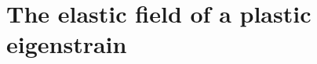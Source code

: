 \documentclass[10pt]{report}
\begin{document}

\tableofcontents



\newtheorem{mytheorem}{Theorem}
\newtheorem{mydefinition}{Definition}






\newcommand{\dL}[0]{\, \text{d}L}
\newcommand{\dA}[0]{\, \text{d}A}
\newcommand{\dV}[0]{\, \text{d}V}

\newcommand{\GP}[0]{G^\Delta}
\newcommand{\hGP}[0]{\hat{G}^\Delta}

\newcommand{\GH}[0]{G^L}
\newcommand{\hGH}[0]{\hat{G}^L}

\newcommand{\bPc}[0]{\beta^{P}}

\newcommand{\bEc}[0]{\beta}

\newcommand{\eEc}[0]{\varepsilon}











\section{The elastic field of a plastic eigenstrain}

\end{document}
